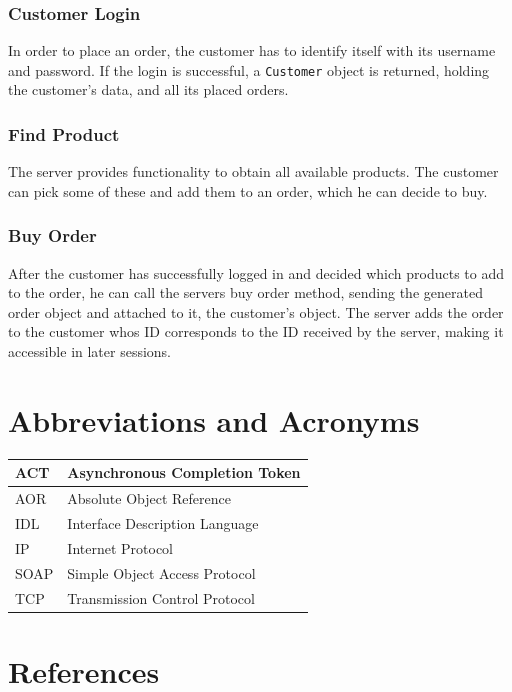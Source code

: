 \documentclass[a4paper]{article}
\begin{document}
\subsubsection{Customer Login}
In order to place an order, the customer has to identify itself with its username and password. If the login is successful, a \texttt{Customer} object is returned, holding the customer's data, and all its placed orders.

\subsubsection{Find Product}
The server provides functionality to obtain all available products. The customer can pick some of these and add them to an order, which he can decide to buy.

\subsubsection{Buy Order}
After the customer has successfully logged in and decided which products to add to the order, he can call the servers buy order method, sending the generated order object and attached to it, the customer's object. The server adds the order to the customer whos ID corresponds to the ID received by the server, making it accessible in later sessions.

\clearpage
\appendix
\section{Abbreviations and Acronyms}
\vspace{0.5cm}
	\begin{tabular}{|l|l|}
	\hline
	ACT & Asynchronous Completion Token\\
	\hline
	AOR & Absolute Object Reference\\
	\hline
	IDL & Interface Description Language\\
	\hline
	IP & Internet Protocol\\
	\hline
	SOAP & Simple Object Access Protocol\\
	\hline
	TCP & Transmission Control Protocol\\
	\hline
	\end{tabular}

\vspace{1cm}

\section{References}
\renewcommand{\refname}{}
\vspace{-1cm}


\end{document}

